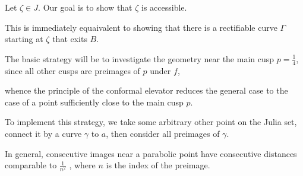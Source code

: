 \documentclass[hebrew,english]{article}
\begin{document}
Let $\zeta\in J$. Our goal is to show that $\zeta$ is accessible. 

This is immediately equaivalent to showing that there is a rectifiable
curve $\Gamma$ starting at $\zeta$ that exits $B$.

The basic strategy will be to investigate the geometry near the main
cusp $p=\frac{1}{4}$, since all other cusps are preimages of $p$
under $f$,

whence the principle of the conformal elevator reduces the general
case to the case of a point sufficiently close to the main cusp $p$.

To implement this strategy, we take some arbitrary other point on
the Julia set, connect it by a curve $\gamma$ to $a$, then consider
all preimages of $\gamma$.

In general, consecutive images near a parabolic point have consecutive
distances comparable to $\frac{1}{n^{2}}$ , where $n$ is the index
of the preimage.
\end{document}
